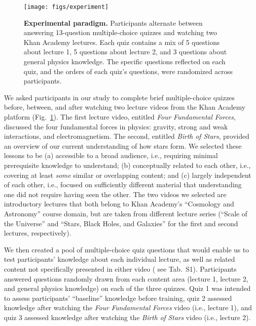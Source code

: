 \documentclass[10pt]{article}
\newcommand{\questions}{S1}
\begin{document}
\begin{figure}[tp]
    \centering
    \texttt{[image: figs/experiment]}

    \caption{\textbf{Experimental paradigm.} Participants alternate between
    answering 13-question multiple-choice quizzes and watching two Khan Academy
    lectures. Each quiz contains a mix of 5 questions about lecture 1, 5
    questions about lecture 2, and 3 questions about general physics knowledge. The
    specific questions reflected on each quiz, and the orders of each quiz's
    questions, were randomized across participants.}

    \label{fig:experiment}
\end{figure}

We asked participants in our study to complete brief multiple-choice quizzes before, between, and after watching two lecture videos from the Khan Academy \citep{Khan04} platform (Fig.~\ref{fig:experiment}). The first lecture video, entitled \textit{Four
Fundamental Forces}, discussed the four fundamental forces in physics: gravity,
strong and weak interactions, and electromagnetism. The second,
entitled \textit{Birth of Stars}, provided an overview of our current
understanding of how stars form.
We selected these lessons to be (a) accessible
to a broad audience, i.e., requiring minimal prerequisite knowledge to understand;
(b) conceptually related to each other, i.e., covering at least \textit{some}
similar or overlapping content; and (c) largely independent of each other, i.e., focused
on sufficiently different material that understanding one did not require having seen
the other. The two videos we selected are introductory lectures that both
belong to Khan Academy's ``Cosmology and Astronomy'' course domain, but are taken from
different lecture series (``Scale of the Universe'' and ``Stars, Black Holes, and Galaxies''
for the first and second lectures, respectively).

We then created a pool of
multiple-choice quiz questions that would enable us to test participants'
knowledge about each individual lecture, as well as related content not
specifically presented in either video ( see Tab.~\questions). Participants answered
questions randomly drawn from each content area (lecture 1, lecture 2, and
general physics knowledge) on each of the three quizzes. Quiz 1 was intended to
assess participants' ``baseline'' knowledge before training, quiz 2 assessed knowledge
after watching the \textit{Four Fundamental Forces} video (i.e., lecture 1),
and quiz 3 assessed knowledge after watching the \textit{Birth of Stars} video
(i.e., lecture 2).
\end{document}
